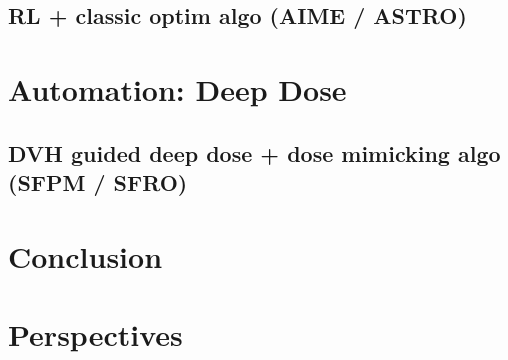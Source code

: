 \documentclass[a4paper,12pt]{book}
\begin{document}
	\section{RL + classic optim algo (AIME / ASTRO)}
	
	\chapter{Automation: Deep Dose}
	\begin{chapterabstract}
	\end{chapterabstract}
	\clearpage
	\localtableofcontents
	\section{DVH guided deep dose + dose mimicking algo (SFPM / SFRO)}
	
	\chapter{Conclusion}
	\chapter{Perspectives}
	
	
	
	
\end{document}
